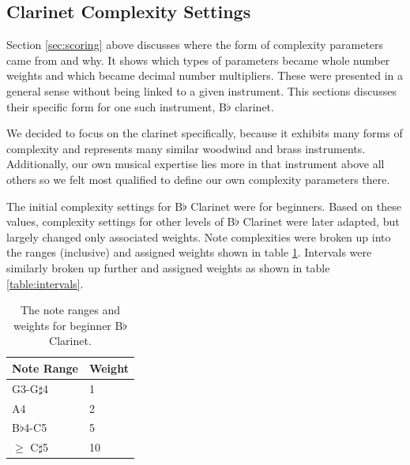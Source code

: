 \documentclass[10pt,preprint]{sigplanconf}
\begin{document}
{\subsection{Clarinet Complexity Settings} 
\label{sec:settings}

Section \ref{sec:scoring} above discusses where the form of complexity parameters came from and why. It shows which types of parameters became whole number weights and which became decimal number multipliers. These were presented in a general sense without being linked to a given instrument. This sections discusses their specific form for one such instrument, B$\flat$ clarinet.

We decided to focus on the clarinet specifically, because it exhibits many forms of complexity and represents many similar woodwind and brass instruments. Additionally, our own musical expertise lies more in that instrument above all others so we felt most qualified to define our own complexity parameters there.

The initial complexity settings for B$\flat$ Clarinet were for beginners. Based on these values, complexity settings for other levels of B$\flat$ Clarinet were later adapted, but largely changed only associated weights. Note complexities were broken up into the ranges (inclusive) and assigned weights shown in table \ref{table:notes}. Intervals were similarly broken up further and assigned weights as shown in table \ref{table:intervals}.  

\begin{table}[t]
	\centering
    \begin{tabular}{| l | l |}
        \hline
        Note Range & Weight \\ \hline
        G3-G$\sharp$4 & 1 \\ \hline
        A4 & 2 \\ \hline
        B$\flat$4-C5 & 5 \\ \hline
        $\geq$ C$\sharp$5 & 10 \\
        \hline
    \end{tabular}
	\caption{The note ranges and weights for beginner B$\flat$ Clarinet.}
	\label{table:notes}
\end{table}

}
\end{document}
